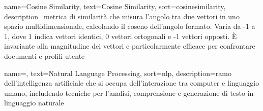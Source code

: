  {
    name=Cosine Similarity,
    text=Cosine Similarity,
    sort=cosinesimilarity,
    description={metrica di similarità che misura l'angolo tra due vettori in uno spazio multidimensionale, calcolando il coseno dell'angolo formato. Varia da -1 a 1, dove 1 indica vettori identici, 0 vettori ortogonali e -1 vettori opposti. È invariante alla magnitudine dei vettori e particolarmente efficace per confrontare documenti e profili utente}
}

 {
    name=,
    text=Natural Language Processing,
    sort=nlp,
    description={ramo dell'intelligenza artificiale che si occupa dell'interazione tra computer e linguaggio umano, includendo tecniche per l'analisi, comprensione e generazione di testo in linguaggio naturale}
}
